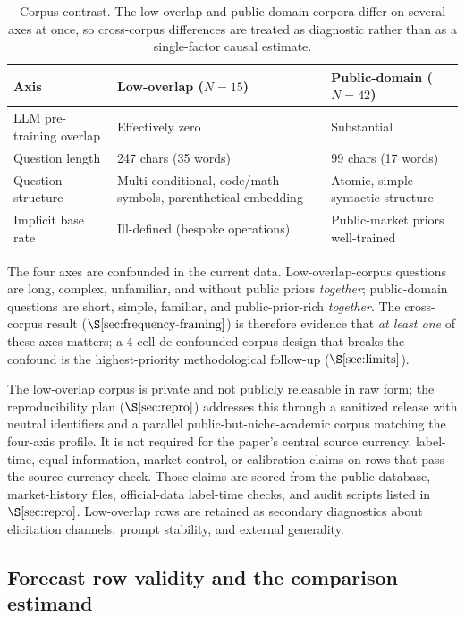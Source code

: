\documentclass[11pt]{article}
\begin{document}
\begin{table}[htbp]
\centering
\small
\begin{tabular}{l L{5.5cm} L{5.5cm}}
\toprule
Axis & Low-overlap ($N{=}15$) & Public-domain ($N{=}42$) \\
\midrule
LLM pre-training overlap & Effectively zero & Substantial \\
Question length & 247 chars (35 words) & 99 chars (17 words) \\
Question structure & Multi-conditional, code/math symbols, parenthetical embedding & Atomic, simple syntactic structure \\
Implicit base rate & Ill-defined (bespoke operations) & Public-market priors well-trained \\
\bottomrule
\end{tabular}
\caption{Corpus contrast. The low-overlap and public-domain corpora differ on several axes at once, so cross-corpus differences are treated as diagnostic rather than as a single-factor causal estimate.}
\label{tab:corpus-contrast}
\end{table}

The four axes are confounded in the current data. Low-overlap-corpus questions are long, complex, unfamiliar, and without public priors \emph{together}; public-domain questions are short, simple, familiar, and public-prior-rich \emph{together}. The cross-corpus result ($\S\ref{sec:frequency-framing}$) is therefore evidence that \emph{at least one} of these axes matters; a 4-cell de-confounded corpus design that breaks the confound is the highest-priority methodological follow-up ($\S\ref{sec:limits}$).

The low-overlap corpus is private and not publicly releasable in raw form; the reproducibility plan ($\S\ref{sec:repro}$) addresses this through a sanitized release with neutral identifiers and a parallel public-but-niche-academic corpus matching the four-axis profile. It is not required for the paper's central source currency, label-time, equal-information, market control, or calibration claims on rows that pass the source currency check. Those claims are scored from the public database, market-history files, official-data label-time checks, and audit scripts listed in $\S\ref{sec:repro}$. Low-overlap rows are retained as secondary diagnostics about elicitation channels, prompt stability, and external generality.

\subsection{Forecast row validity and the comparison estimand}
\label{sec:row-estimand}
\end{document}
